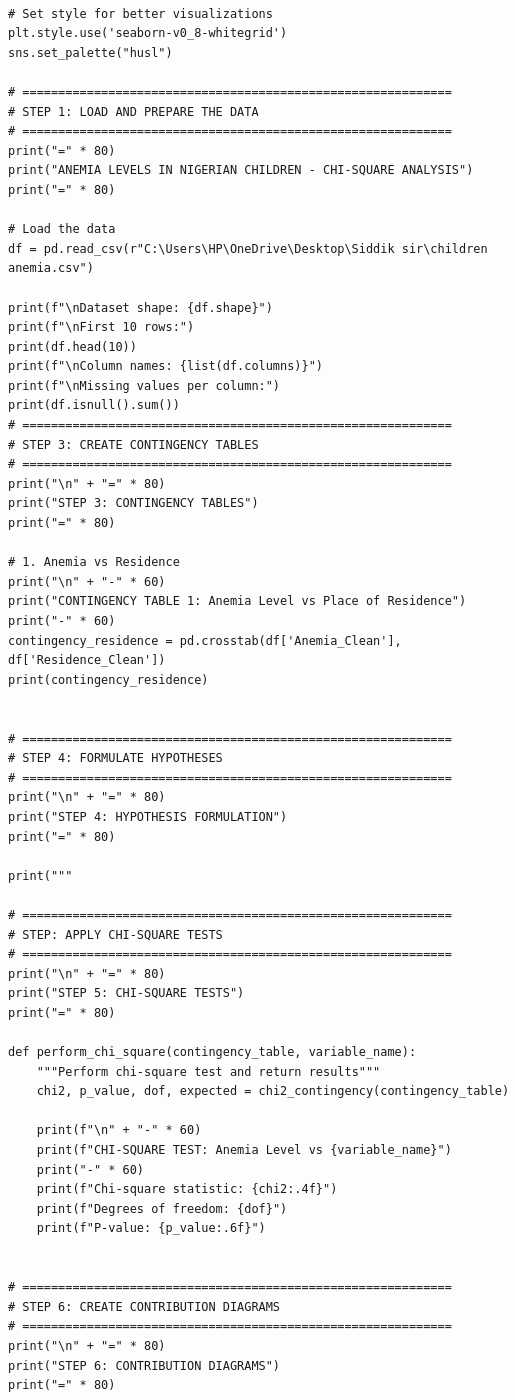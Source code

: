 \documentclass[12pt]{article}
\begin{document}
\begin{verbatim}

# Set style for better visualizations
plt.style.use('seaborn-v0_8-whitegrid')
sns.set_palette("husl")

# ============================================================
# STEP 1: LOAD AND PREPARE THE DATA
# ============================================================
print("=" * 80)
print("ANEMIA LEVELS IN NIGERIAN CHILDREN - CHI-SQUARE ANALYSIS")
print("=" * 80)

# Load the data
df = pd.read_csv(r"C:\Users\HP\OneDrive\Desktop\Siddik sir\children anemia.csv")

print(f"\nDataset shape: {df.shape}")
print(f"\nFirst 10 rows:")
print(df.head(10))
print(f"\nColumn names: {list(df.columns)}")
print(f"\nMissing values per column:")
print(df.isnull().sum())
# ============================================================
# STEP 3: CREATE CONTINGENCY TABLES
# ============================================================
print("\n" + "=" * 80)
print("STEP 3: CONTINGENCY TABLES")
print("=" * 80)

# 1. Anemia vs Residence
print("\n" + "-" * 60)
print("CONTINGENCY TABLE 1: Anemia Level vs Place of Residence")
print("-" * 60)
contingency_residence = pd.crosstab(df['Anemia_Clean'], df['Residence_Clean'])
print(contingency_residence)


# ============================================================
# STEP 4: FORMULATE HYPOTHESES
# ============================================================
print("\n" + "=" * 80)
print("STEP 4: HYPOTHESIS FORMULATION")
print("=" * 80)

print("""

# ============================================================
# STEP: APPLY CHI-SQUARE TESTS
# ============================================================
print("\n" + "=" * 80)
print("STEP 5: CHI-SQUARE TESTS")
print("=" * 80)

def perform_chi_square(contingency_table, variable_name):
    """Perform chi-square test and return results"""
    chi2, p_value, dof, expected = chi2_contingency(contingency_table)
    
    print(f"\n" + "-" * 60)
    print(f"CHI-SQUARE TEST: Anemia Level vs {variable_name}")
    print("-" * 60)
    print(f"Chi-square statistic: {chi2:.4f}")
    print(f"Degrees of freedom: {dof}")
    print(f"P-value: {p_value:.6f}")
    
    
# ============================================================
# STEP 6: CREATE CONTRIBUTION DIAGRAMS
# ============================================================
print("\n" + "=" * 80)
print("STEP 6: CONTRIBUTION DIAGRAMS")
print("=" * 80)


\end{verbatim}
\end{document}
